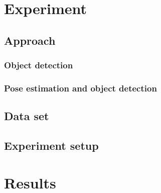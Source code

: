 \pagebreak
\section{Experiment}

\subsection{Approach}
\subsubsection{Object detection}
\subsubsection{Pose estimation and object detection}

\subsection{Data set}

\subsection{Experiment setup}


\section{Results}

